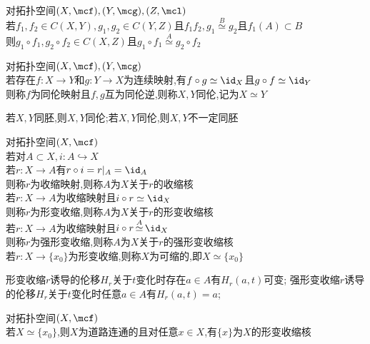 \begin{dingli}
对拓扑空间$(X,\mcf),(Y,\mcg),(Z,\mcl)$\\
若$f_1,f_2\in C(X,Y),g_1,g_2\in C(Y,Z)$且$f_1f_2,g_1\mathop{\simeq}\limits^{B}g_2$且$f_1(A)\subset B$\\
则$g_1\circ f_1,g_2\circ f_2\in C(X,Z)$且$g_1\circ f_1\mathop{\simeq}\limits^{A}g_2\circ f_2$
\end{dingli}

\begin{dingyi}
对拓扑空间$(X,\mcf),(Y,\mcg)$\\
若存在$f:X\to Y$和$g:Y\to X$为连续映射,有$f\circ g\simeq \id_{X}$且$g\circ f\simeq \id_{Y}$\\
则称$f$为同伦映射且$f,g$互为同伦逆,则称$X,Y$同伦,记为$X\simeq Y$
\end{dingyi}

\begin{zhu}
若$X,Y$同胚,则$X,Y$同伦;若$X,Y$同伦,则$X,Y$不一定同胚
\end{zhu}

\begin{dingyi}
对拓扑空间$(X,\mcf)$\\
若对$A\subset X,i:A\hookrightarrow X$\\
若$r:X\to A$有$r\circ i=r|_{A}=\id_{A}$\\
则称$r$为收缩映射,则称$A$为$X$关于$r$的收缩核\\
若$r:X\to A$为收缩映射且$i\circ r\simeq \id_{X}$\\
则称$r$为形变收缩,则称$A$为$X$关于$r$的形变收缩核\\
若$r:X\to A$为收缩映射且$i\circ r\mathop{\simeq}\limits^{A} \id_{X}$\\
则称$r$为强形变收缩,则称$A$为$X$关于$r$的强形变收缩核\\
若$r:X\to \{x_0\}$为形变收缩,则称$X$为可缩的,即$X\simeq \{x_0\}$
\end{dingyi}

\begin{zhu}
形变收缩$r$诱导的伦移$H_{r}$关于$t$变化时存在$a\in A$有$H_{r}(a,t)$可变;
强形变收缩$r$诱导的伦移$H_{r}$关于$t$变化时任意$a\in A$有$H_{r}(a,t)=a$;
\end{zhu}

\begin{dingli}
对拓扑空间$(X,\mcf)$\\
若$X\simeq \{x_0\}$,则$X$为道路连通的且对任意$x\in X$,有$\{x\}$为$X$的形变收缩核
\end{dingli}

